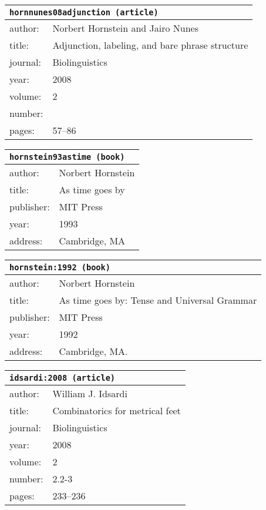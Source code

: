 \documentclass{article}
\begin{document}
\bigskip

\begin{tabular}{p{}p{}}
\multicolumn{2}{l}{\texttt{hornnunes08adjunction (article)}}\\
\hline
author: & Norbert Hornstein and Jairo Nunes\\
title: & Adjunction, labeling, and bare phrase structure\\
journal: & Biolinguistics\\
year: & 2008\\
volume: & 2\\
number: & \\
pages: & 57--86\\
\end{tabular}

\bigskip

\begin{tabular}{p{}p{}}
\multicolumn{2}{l}{\texttt{hornstein93astime (book)}}\\
\hline
author: & Norbert Hornstein\\
title: & As time goes by\\
publisher: & MIT Press\\
year: & 1993\\
address: & Cambridge, MA\\
\end{tabular}

\bigskip

\begin{tabular}{p{}p{}}
\multicolumn{2}{l}{\texttt{hornstein:1992 (book)}}\\
\hline
author: & Norbert Hornstein\\
title: & As time goes by: Tense and Universal Grammar\\
publisher: & MIT Press\\
year: & 1992\\
address: & Cambridge, MA.\\
\end{tabular}

\bigskip

\begin{tabular}{p{}p{}}
\multicolumn{2}{l}{\texttt{idsardi:2008 (article)}}\\
\hline
author: & William J. Idsardi\\
title: & Combinatorics for metrical feet\\
journal: & Biolinguistics\\
year: & 2008\\
volume: & 2\\
number: & 2.2-3\\
pages: & 233--236\\
\end{tabular}
\end{document}
